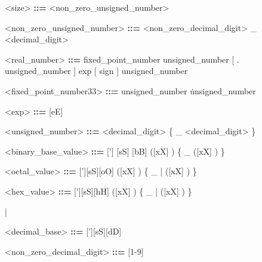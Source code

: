 \documentclass{article}
\begin{document}
{\begin{grammar}
    <size> \textbf{::=} <non_zero_unsigned_number>
\end{grammar}

\begin{grammar}
    <non_zero_unsigned_number> \textbf{::=} <non_zero_decimal_digit> { _ \alt <decimal_digit>}
\end{grammar}


\begin{grammar}
    <real_number> \textbf{::=} fixed_point_number
                               \alt unsigned_number [ . unsigned_number ] exp [ sign ] unsigned_number

\end{grammar}

\begin{grammar}
    <fixed_point_number33> \textbf{::=} unsigned_number \. unsigned_number
\end{grammar}

\begin{grammar}
    <exp> \textbf{::=} [eE]
\end{grammar}

\begin{grammar}
    <unsigned_number> \textbf{::=} <decimal_digit> \{ _ \alt <decimal_digit> \}
\end{grammar}

\begin{grammar}
    <binary_base_value> \textbf{::=} ['] [sS] [bB] ([xX] \alt [zZ?] \alt [0-1]) \{ _ \alt ([xX] \alt [zZ?] \alt [0-1]) \}
\end{grammar}

\begin{grammar}
    <octal_value> \textbf{::=} ['][sS][oO] ([xX] \alt [zZ?] \alt [0-7]) \{ _ | ([xX] \alt [zZ?] \alt [0-7]) \}
\end{grammar}

\begin{grammar}
    <hex_value> \textbf{::=} ['][sS][hH] ([xX] \alt [zZ?] \alt [0-9] \alt [a-fA-F]) \{ _ | ([xX] \alt [zZ?] \alt [0-9] \alt [a-fA-F]) \}
\end{grammar}|

\begin{grammar}
    <decimal_base> \textbf{::=} ['][sS][dD]
\end{grammar}

\begin{grammar}
    <non_zero_decimal_digit> \textbf{::=} [1-9]
\end{grammar}

}
\end{document}
